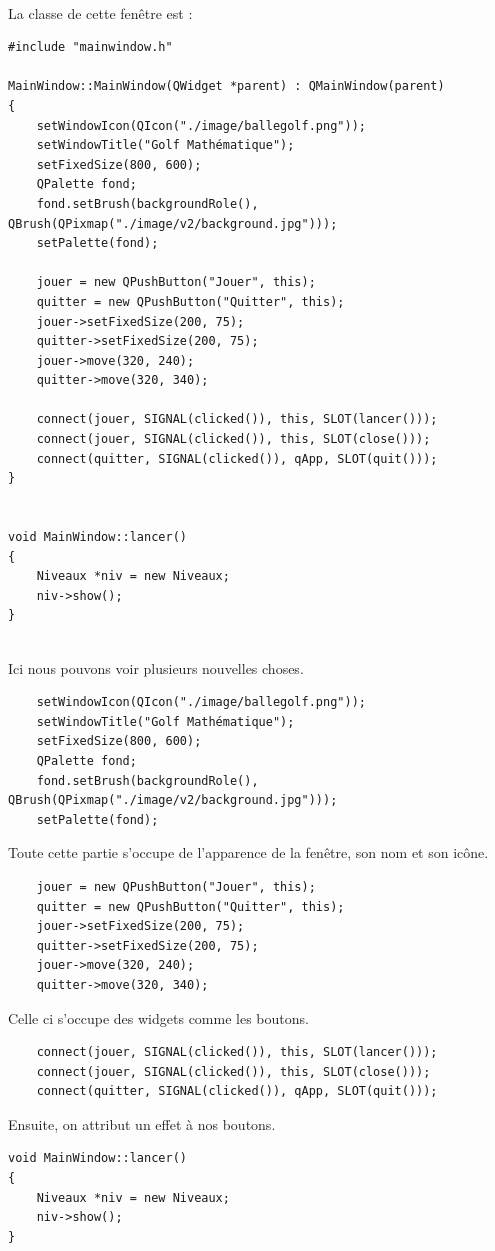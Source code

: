 \documentclass{article}
\begin{document}
~\\
La classe de cette fenêtre est :
\begin{verbatim}
#include "mainwindow.h"

MainWindow::MainWindow(QWidget *parent) : QMainWindow(parent)
{
    setWindowIcon(QIcon("./image/ballegolf.png"));
    setWindowTitle("Golf Mathématique");
    setFixedSize(800, 600);
    QPalette fond;
    fond.setBrush(backgroundRole(), QBrush(QPixmap("./image/v2/background.jpg")));
    setPalette(fond);

    jouer = new QPushButton("Jouer", this);
    quitter = new QPushButton("Quitter", this);
    jouer->setFixedSize(200, 75);
    quitter->setFixedSize(200, 75);
    jouer->move(320, 240);
    quitter->move(320, 340);

    connect(jouer, SIGNAL(clicked()), this, SLOT(lancer()));
    connect(jouer, SIGNAL(clicked()), this, SLOT(close()));
    connect(quitter, SIGNAL(clicked()), qApp, SLOT(quit()));
}


void MainWindow::lancer()
{
    Niveaux *niv = new Niveaux;
    niv->show();
}
\end{verbatim}
~\\
Ici nous pouvons voir plusieurs nouvelles choses. 
\begin{verbatim}
	setWindowIcon(QIcon("./image/ballegolf.png"));
    setWindowTitle("Golf Mathématique");
    setFixedSize(800, 600);
    QPalette fond;
    fond.setBrush(backgroundRole(), QBrush(QPixmap("./image/v2/background.jpg")));
    setPalette(fond);
\end{verbatim}
Toute cette partie s'occupe de l'apparence de la fenêtre, son nom et son icône.
\begin{verbatim}
    jouer = new QPushButton("Jouer", this);
    quitter = new QPushButton("Quitter", this);
    jouer->setFixedSize(200, 75);
    quitter->setFixedSize(200, 75);
    jouer->move(320, 240);
    quitter->move(320, 340);
\end{verbatim}
Celle ci s'occupe des widgets comme les boutons.
\begin{verbatim}
    connect(jouer, SIGNAL(clicked()), this, SLOT(lancer()));
    connect(jouer, SIGNAL(clicked()), this, SLOT(close()));
    connect(quitter, SIGNAL(clicked()), qApp, SLOT(quit()));
\end{verbatim}
Ensuite, on attribut un effet à nos boutons.
\begin{verbatim}
void MainWindow::lancer()
{
    Niveaux *niv = new Niveaux;
    niv->show();
}
\end{verbatim}
\end{document}
